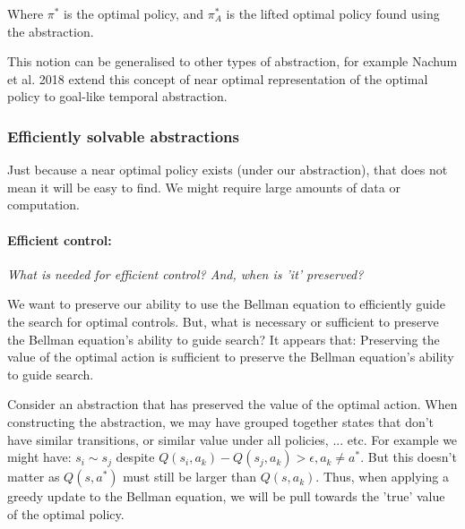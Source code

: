 Where $\pi^{* }$ is the optimal policy, and $\pi_{A}^{* }$ is the lifted optimal
policy found using the abstraction.

This notion can be generalised to other types of abstraction, for example
Nachum et al. 2018 \cite{Nachum2018} extend this concept of near optimal
representation of the optimal policy to goal-like temporal abstraction\footnotemark.


\newpage
\subsubsection{Efficiently solvable abstractions}

Just because a near optimal policy exists (under our abstraction), that does not mean it will be easy to find.
We might require large amounts of data or computation.

\paragraph{Efficient control:} \label{efficient-control} \textsl{What is needed for efficient control? And, when is 'it' preserved?}

We want to preserve our ability to use the Bellman equation to efficiently guide the search for optimal controls.
But, what is necessary or sufficient to preserve the Bellman equation's ability to guide search?
It appears that: Preserving the value of the optimal action is sufficient to preserve the Bellman equation's ability to guide search\cite{Jong2005,Littman2006,Abel2017}.

Consider an abstraction that has preserved the value of the optimal action.
When constructing the abstraction, we may have grouped together states that don't have similar transitions, or similar value under all policies, ... etc.
For example we might have: $s_i \sim s_j$ despite $Q(s_i, a_k) - Q(s_j, a_k) > \epsilon, a_k \neq a^{* }$.
But this doesn't matter as $Q(s, a^{* })$ must still be larger than $Q(s, a_k)$.
Thus, when applying a greedy update to the Bellman equation, we will be pull towards the 'true' value of the optimal policy\footnotemark.

